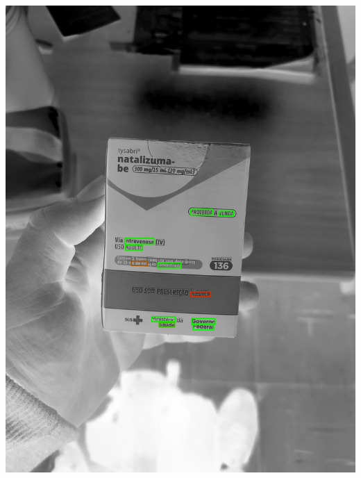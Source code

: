 \begin{frame}
\begin{columns}
\begin{column}{0.24\textwidth}
			\includegraphics[height=0.35\textheight]{../pictures/tysabri_cmyk_k_only_boxes.jpg}
		\end{column}
	\end{columns}
\end{frame}


